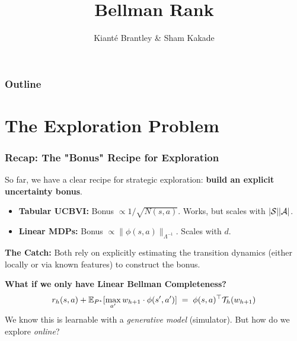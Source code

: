 \documentclass[aspectratio=169]{beamer}
\title[Bellman Rank]{Bellman Rank}
\author[Sham \& Kiant\'{e}]{Kiant\'{e} Brantley \& Sham Kakade}
\date{}
\begin{document}
\begin{frame}
\titlepage  
\end{frame}

\begin{frame}[noframenumbering]
  \frametitle{Outline}
  \tableofcontents
\end{frame}

\section{The Exploration Problem}

\begin{frame}\frametitle{Recap: The "Bonus" Recipe for Exploration}

So far, we have a clear recipe for strategic exploration: \textbf{build an explicit uncertainty bonus}.

\vspace{0.2cm}
\begin{itemize}
    \item \textbf{Tabular UCBVI:} Bonus $\propto 1/\sqrt{N(s,a)}$. Works, but scales with $|\mathcal{S}||\mathcal{A}|$.
    \item \textbf{Linear MDPs:} Bonus $\propto \|\phi(s,a)\|_{\Lambda^{-1}}$. Scales with $d$.
\end{itemize}

\vspace{0.4cm}
\pause
\textbf{The Catch:} Both rely on explicitly estimating the transition dynamics (either locally or via known features) to construct the bonus.

\vspace{0.2cm}
\pause
\textbf{What if we only have Linear Bellman Completeness?}
\[
r_h(s,a) + \mathbb{E}_{P^\star}[\max_{a'} w_{h+1} \cdot \phi(s',a')] \;=\; \phi(s,a)^\top \mathcal{T}_h(w_{h+1})
\]
We know this is learnable with a \emph{generative model}
(simulator). But how do we explore \emph{online}?
\end{frame}
\end{document}
